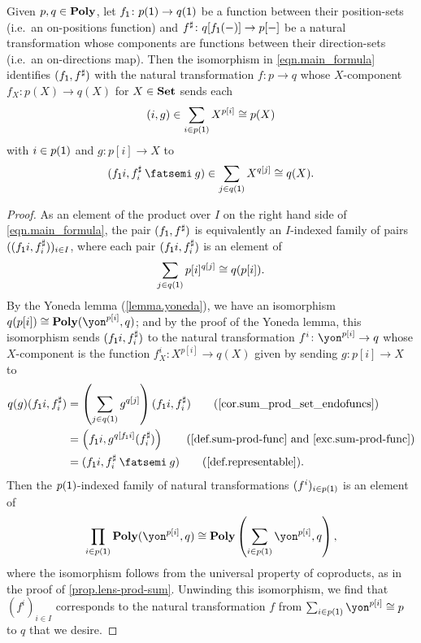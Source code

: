 \documentclass[Book-Poly]{subfiles}
\begin{document}
\begin{proposition} \label{prop.morph_arena_to_func}
Given $p,q\in\mathbf{Poly}$, let $f_{\textsf{1}}\colon p(\textsf{1})\to q(\textsf{1})$ be a function between their position-sets (i.e.\ an on-positions function) and $f^\sharp\colon q[f_{\textsf{1}}(-)]\to p[-]$ be a natural transformation whose components are functions between their direction-sets (i.e.\ an on-directions map).
Then the isomorphism in \eqref{eqn.main_formula} identifies $(f_{\textsf{1}},f^\sharp)$ with the natural transformation $f\colon p\to q$ whose $X$-component $f_X\colon p(X)\to q(X)$ for $X\in\mathbf{Set}$ sends each
\[
    (i,g)\in\sum_{i\in p(\textsf{1})} X^{p[i]}\cong p(X)
\]
with $i\in p(\textsf{1})$ and $g\colon p[i]\to X$ to
\[
    (f_\1i,f^\sharp_i\then g)\in\sum_{j\in q(\1)}X^{q[j]}\iso q(X).
\]
\end{proposition}
\begin{proof}
As an element of the product over $I$ on the right hand side of \eqref{eqn.main_formula}, the pair $(f_{\textsf{1}},f^\sharp)$ is equivalently an $I$-indexed family of pairs $((f_{\textsf{1}}i,f^\sharp_i))_{i\in I}$, where each pair $(f_{\textsf{1}}i,f^\sharp_i)$ is an element of
\[
    \sum_{j\in q(\textsf{1})}p[i]^{q[j]}\cong q(p[i]).
\]
By the Yoneda lemma (\cref{lemma.yoneda}), we have an isomorphism $q(p[i])\iso\poly(\yon^{p[i]}, q)$; and by the proof of the Yoneda lemma, this isomorphism sends $(f_{\textsf{1}}i, f^\sharp_i)$ to the natural transformation $f^i\colon\yon^{p[i]} \to q$ whose $X$-component is the function $f^i_X\colon X^{p[i]}\to q(X)$ given by sending $g\colon p[i]\to X$ to
\begin{align*}
    q(g)(f_\1i, f^\sharp_i) &= \left(\sum_{j \in q(\1)} g^{q[j]}\right)(f_\1i, f^\sharp_i) \tag{\cref{cor.sum_prod_set_endofuncs}} \\
    &= \left(f_\1i, g^{q[f_\1i]}(f^\sharp_i)\right) \tag{\cref{def.sum-prod-func} and \cref{exc.sum-prod-func}} \\
    &= (f_\1i, f^\sharp_i\then g) \tag{\cref{def.representable}}.
\end{align*}
Then the $p(\textsf{1})$-indexed family of natural transformations $(f^i)_{i\in p(\textsf{1})}$ is an element of
\[
  \prod_{i\in p(\1)}\poly(\yon^{p[i]}, q)\iso\poly\left(\sum_{i\in p(\1)}\yon^{p[i]},q\right),
\]
where the isomorphism follows from the universal property of coproducts, as in the proof of \cref{prop.lens-prod-sum}.
Unwinding this isomorphism, we find that $(f^i)_{i\in I}$ corresponds to the natural transformation $f$ from $\sum_{i\in p(\1)}\yon^{p[i]}\iso p$ to $q$ that we desire.
\end{proof}
\end{document}
